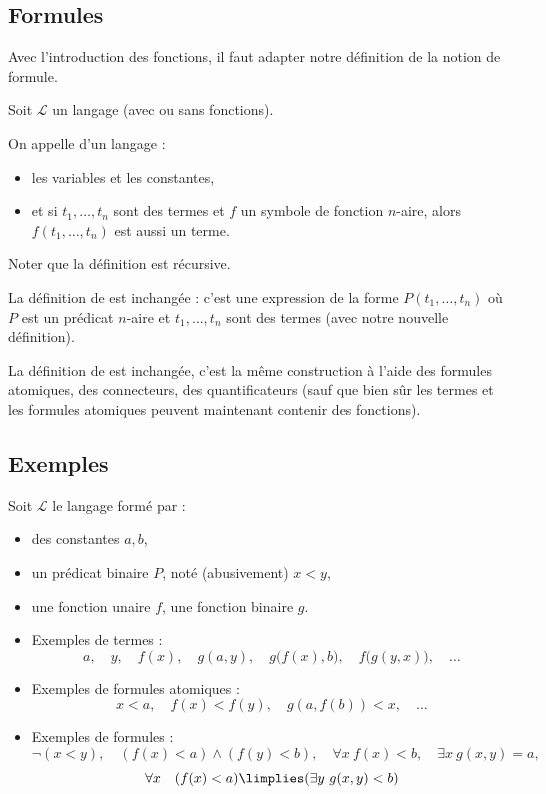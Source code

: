 \documentclass[11pt,class=report,crop=false]{standalone}
\begin{document}
\subsection{Formules}

Avec l'introduction des fonctions, il faut adapter notre définition de la notion de formule.

Soit $\mathcal{L}$ un langage (avec ou sans fonctions).
\begin{definition}
	On appelle  d'un langage :
	\begin{itemize}
		\item les variables et les constantes,
		
		\item et si $t_1,\ldots,t_n$ sont des termes et $f$ un symbole de fonction $n$-aire, alors $f(t_1,\ldots,t_n)$ est aussi un terme.
	\end{itemize}
\end{definition}
Noter que la définition est récursive.

La définition de  est inchangée : c'est une expression de la forme 
$P(t_1,\ldots,t_n)$ où $P$ est un prédicat $n$-aire et $t_1, \ldots,t_n$ sont des termes (avec notre nouvelle définition).

La définition de  est inchangée, c'est la même construction à l'aide des formules atomiques, des connecteurs, des quantificateurs (sauf que bien sûr les termes et les formules atomiques peuvent maintenant contenir des fonctions).

\subsection{Exemples}

Soit $\mathcal{L}$ le langage formé par :
\begin{itemize}
	\item des constantes $a, b$,
	
	\item un prédicat binaire $P$, noté (abusivement) $x < y$,
	
	\item une fonction unaire $f$, une fonction binaire $g$.
\end{itemize}


\begin{itemize}
	\item Exemples de termes :
	\[
	a, \quad y, \quad f(x), \quad g(a,y), \quad g\big( f(x), b \big), \quad f\big( g(y,x) \big), \quad\ldots
	\]
	
	
	\item Exemples de formules atomiques :
	\[
	x < a, \quad f(x) < f(y), \quad g( a, f(b) ) < x, \quad\ldots
	\]
	
	\item Exemples de formules :
	\[
	\lnot(x < y), 
	\quad (f(x) < a) \land (f(y) < b), 
	\quad \forall x \ f(x) < b,
	\quad \exists x \ g(x,y) = a,
	\]
	\[
	\forall x  \quad (f(x) < a) \limplies (\exists y \ g(x,y) < b)
	\]	
\end{itemize}
\end{document}
